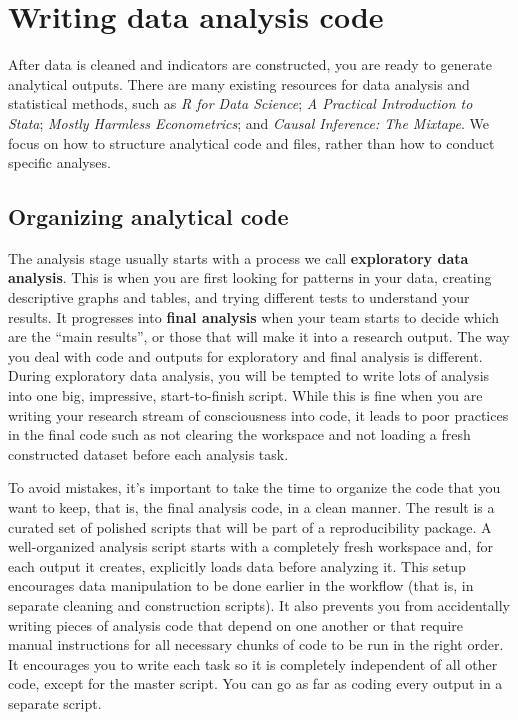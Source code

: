 
\section{Writing data analysis code}

After data is cleaned and indicators are constructed, you are ready to generate analytical outputs.
There are many existing resources for data analysis and statistical methods, such as
\textit{R for Data Science};\cite{hadley2017R}
\textit{A Practical Introduction to Stata};\cite{RePEc:gdm:wpaper:9412}
\textit{Mostly Harmless Econometrics};\cite{angrist2008mostly}
and \textit{Causal Inference: The Mixtape}.
We focus on how to structure analytical code and files, rather than how to conduct specific analyses.

\subsection{Organizing analytical code}

The analysis stage usually starts with a process we call \textbf{exploratory data analysis}.
This is when you are first looking for patterns in your data,
creating descriptive graphs and tables,
and trying different tests to understand your results.
It progresses into \textbf{final analysis} when your team starts to decide which are the ``main results'', or
those that will make it into a research output.
The way you deal with code and outputs for exploratory and final analysis is different.
During exploratory data analysis,
you will be tempted to write lots of analysis into one big, impressive, start-to-finish script.
While this is fine when you are writing your research stream of consciousness into code, 
it leads to poor practices in the final code such as not clearing the workspace 
and not loading a fresh constructed dataset before each analysis task.

To avoid mistakes, it's important to take the time
to organize the code that you want to keep, that is,
the final analysis code, in a clean manner.
The result is a curated set of polished scripts that will be part of a reproducibility package.
A well-organized analysis script starts with a completely fresh workspace
and, for each output it creates, explicitly loads data before analyzing it.
This setup encourages data manipulation to be done earlier in the workflow
(that is, in separate cleaning and construction scripts).
It also prevents you from accidentally writing pieces of analysis code that depend on one another
or that require manual instructions for all necessary chunks of code to be run in the right order.
It encourages you to write each task so it is completely independent of all other code,
except for the master script.
You can go as far as coding every output in a separate script.

